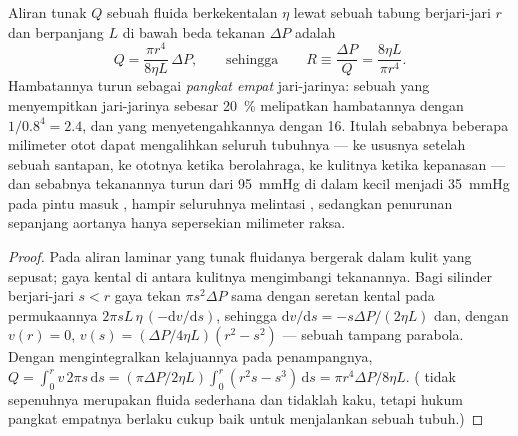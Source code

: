 \begin{theorem}\label{thm:b2:blood-circulation:poiseuille}
Aliran tunak $Q$ sebuah fluida berkekentalan $\eta$ lewat sebuah tabung
berjari-jari $r$ dan berpanjang $L$ di bawah beda tekanan $\Delta P$
adalah
\[
Q = \frac{\pi r^{4}}{8\eta L}\,\Delta P, \qquad \text{sehingga}\qquad
R \equiv \frac{\Delta P}{Q} = \frac{8\eta L}{\pi r^{4}} .
\]
Hambatannya turun sebagai \emph{pangkat empat} jari-jarinya: sebuah
 yang menyempitkan jari-jarinya sebesar \qty{20}{\%}
melipatkan hambatannya dengan $1/0.8^{4} = 2.4$, dan yang
menyetengahkannya dengan 16. Itulah sebabnya beberapa milimeter otot
 dapat mengalihkan  seluruh tubuhnya --- ke ususnya
setelah sebuah santapan, ke ototnya ketika berolahraga, ke kulitnya
ketika kepanasan --- dan sebabnya tekanannya turun dari \qty{95}{mmHg}
di dalam  kecil menjadi \qty{35}{mmHg} pada pintu masuk
, hampir seluruhnya melintasi , sedangkan
penurunan sepanjang aortanya hanya sepersekian milimeter raksa.
\end{theorem}
\begin{proof}
Pada aliran laminar yang tunak fluidanya bergerak dalam kulit yang
sepusat; gaya kental di antara kulitnya mengimbangi tekanannya. Bagi
silinder berjari-jari $s < r$ gaya tekan $\pi s^{2}\Delta P$ sama
dengan seretan kental pada permukaannya $2\pi s L\,\eta\,(-\mathrm{d}v/
\mathrm{d}s)$, sehingga $\mathrm{d}v/\mathrm{d}s = -s\Delta P/(2\eta L)$
dan, dengan $v(r) = 0$, $v(s) = (\Delta P/4\eta L)(r^{2} - s^{2})$ ---
sebuah tampang parabola. Dengan mengintegralkan kelajuannya pada
penampangnya,
$Q = \int_{0}^{r} v\,2\pi s\,\mathrm{d}s = (\pi\Delta P/2\eta L)
\int_{0}^{r}(r^{2}s - s^{3})\,\mathrm{d}s = \pi r^{4}\Delta P/8\eta
L$. ( tidak sepenuhnya merupakan fluida sederhana dan 
tidaklah kaku, tetapi hukum pangkat empatnya berlaku cukup baik untuk
menjalankan sebuah tubuh.)
\end{proof}

